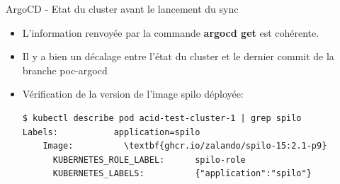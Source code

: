 \begin{frame}[fragile]{ArgoCD - Etat du cluster avant le lancement du sync}

\begin{itemize}
   \item L'information renvoyée par la commande \textbf{argocd get} est cohérente.
   \item Il y a bien un décalage entre l'état du cluster et le dernier commit de la branche poc-argocd
   \item Vérification de la version de l'image spilo déployée:
\begin{tiny}
\begin{Verbatim}[commandchars=\\\{\}]
$ kubectl describe pod acid-test-cluster-1 | grep spilo
Labels:           application=spilo
    Image:          \textbf{ghcr.io/zalando/spilo-15:2.1-p9}
      KUBERNETES_ROLE_LABEL:      spilo-role
      KUBERNETES_LABELS:          {"application":"spilo"}
\end{Verbatim}
\end{tiny}

\end{itemize}

\end{frame}


